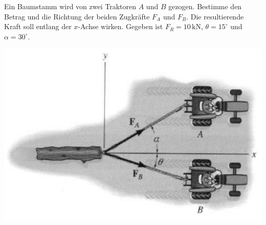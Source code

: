 \documentclass[german,12pt]{homework}
\newcommand{\sis}[1]{\,\si{#1}}
\begin{document}
    \begin{problem}
        Ein Baumstamm wird von zwei Traktoren \(A\) und \(B\) gezogen. Bestimme den Betrag und die Richtung der beiden Zugkräfte \(F_A\) und \(F_B\). Die resultierende Kraft soll entlang der \(x\)-Achse wirken. Gegeben ist \(F_R = 10\sis{\kilo\newton}\), \(\theta = 15^\circ\) und \(\alpha = 30^\circ\).

        \begin{center}
            \includegraphics[scale=.4]{traktoren}
        \end{center}
    \end{problem}
\end{document}
